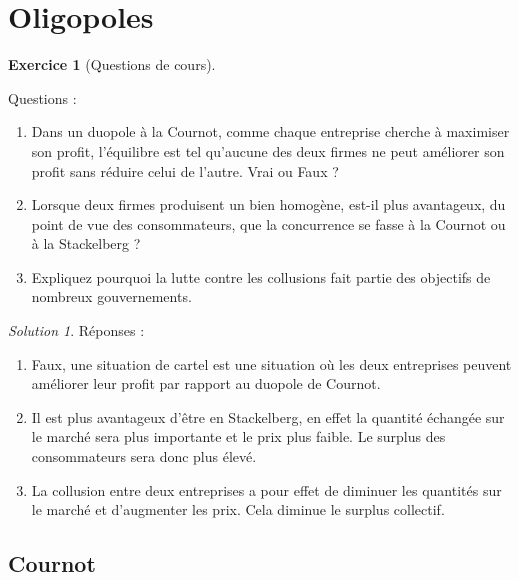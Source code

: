 \documentclass[
]{book}
\providecommand{\tightlist}{%
  \setlength{\itemsep}{0pt}\setlength{\parskip}{0pt}}
\theoremstyle{definition}
\theoremstyle{definition}
\theoremstyle{definition}
\newtheorem{exercise}{Exercice}[chapter]
\theoremstyle{definition}
\theoremstyle{remark}
\newtheorem*{solution}{Solution}
\begin{document}
\hypertarget{oligopoles-1}{%
\section{Oligopoles}\label{oligopoles-1}}

\begin{exercise}[Questions de cours]
\protect\hypertarget{exr:oligopolequestions}{}\label{exr:oligopolequestions}

Questions :

\begin{enumerate}
\def\labelenumi{\arabic{enumi}.}
\tightlist
\item
  Dans un duopole à la Cournot, comme chaque entreprise
  cherche à maximiser son profit, l'équilibre est tel qu'aucune des
  deux firmes ne peut améliorer son profit sans réduire celui de
  l'autre. Vrai ou Faux ?
\item
  Lorsque deux firmes produisent un bien homogène, est-il
  plus avantageux, du point de vue des consommateurs, que la
  concurrence se fasse à la Cournot ou à la Stackelberg ?
\item
  Expliquez pourquoi la lutte contre les collusions fait
  partie des objectifs de nombreux gouvernements.
\end{enumerate}

\end{exercise}

\begin{solution}

Réponses :

\begin{enumerate}
\def\labelenumi{\arabic{enumi}.}
\tightlist
\item
  Faux, une situation de cartel est une situation où les deux entreprises peuvent améliorer leur profit par rapport au duopole de Cournot.
\item
  Il est plus avantageux d'être en Stackelberg, en effet la quantité échangée sur le marché sera plus importante et le prix plus faible.
  Le surplus des consommateurs sera donc plus élevé.
\item
  La collusion entre deux entreprises a pour effet de diminuer les quantités sur le marché et d'augmenter les prix.
  Cela diminue le surplus collectif.
\end{enumerate}

\end{solution}

\hypertarget{cournot}{%
\subsection{Cournot}\label{cournot}}
\end{document}
